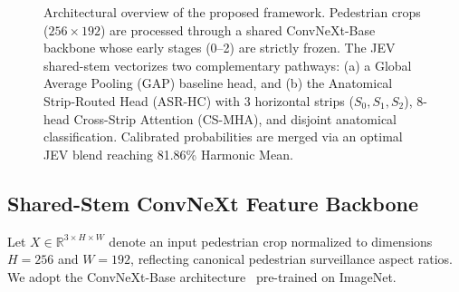 \begin{figure}[t]
{
}
\caption{Architectural overview of the proposed framework. Pedestrian crops ($256 \times 192$) are processed through a shared ConvNeXt-Base backbone whose early stages (0--2) are strictly frozen. The JEV shared-stem vectorizes two complementary pathways: (a) a Global Average Pooling (GAP) baseline head, and (b) the Anatomical Strip-Routed Head (ASR-HC) with 3 horizontal strips ($S_0, S_1, S_2$), 8-head Cross-Strip Attention (CS-MHA), and disjoint anatomical classification. Calibrated probabilities are merged via an optimal JEV blend reaching 81.86\% Harmonic Mean.}
\label{fig:architecture}
\end{figure}

\subsection{Shared-Stem ConvNeXt Feature Backbone}
Let $X \in \mathbb{R}^{3 \times H \times W}$ denote an input pedestrian crop normalized to dimensions $H=256$ and $W=192$, reflecting canonical pedestrian surveillance aspect ratios. We adopt the ConvNeXt-Base architecture~\cite{liu2022convnet} pre-trained on ImageNet. 

